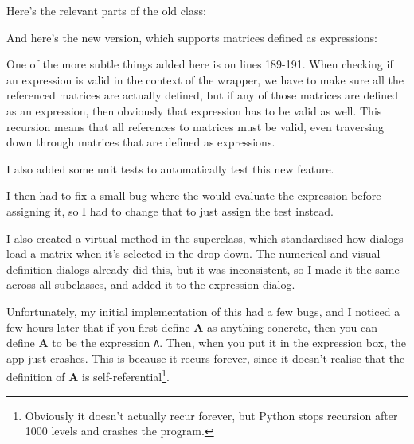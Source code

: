 \documentclass[../development.tex]{subfiles}
\begin{document}
Here's the relevant parts of the old  class:


And here's the new version, which supports matrices defined as expressions:


One of the more subtle things added here is on lines 189-191. When checking if an expression is valid in the context of the wrapper, we have to make sure all the referenced matrices are actually defined, but if any of those matrices are defined as an expression, then obviously that expression has to be valid as well. This recursion means that all references to matrices must be valid, even traversing down through matrices that are defined as expressions.

I also added some unit tests to automatically test this new feature.




I then had to fix a small bug where the  would evaluate the expression before assigning it, so I had to change that to just assign the test instead.


I also created a virtual method in the  superclass, which standardised how dialogs load a matrix when it's selected in the drop-down. The numerical and visual definition dialogs already did this, but it was inconsistent, so I made it the same across all subclasses, and added it to the expression dialog.


Unfortunately, my initial implementation of this had a few bugs, and I noticed a few hours later that if you first define $\mathbf{A}$ as anything concrete, then you can define $\mathbf{A}$ to be the expression \texttt{A}. Then, when you put it in the expression box, the app just crashes. This is because it recurs forever, since it doesn't realise that the definition of $\mathbf{A}$ is self-referential\footnote{Obviously it doesn't actually recur forever, but Python stops recursion after 1000 levels and crashes the program.}.
\end{document}
